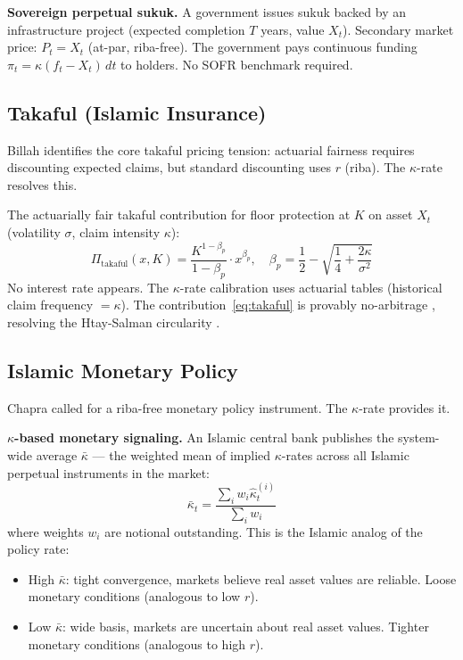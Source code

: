 \documentclass[10pt,twocolumn]{article}
\theoremstyle{plain}
\theoremstyle{definition}
\begin{document}
\textbf{Sovereign perpetual sukuk.}
A government issues sukuk backed by an infrastructure project
(expected completion $T$ years, value $X_t$). Secondary market
price: $P_t = X_t$ (at-par, riba-free). The government pays
continuous funding $\pi_t = \kappa(f_t - X_t)\,dt$ to holders.
No SOFR benchmark required.

\subsection{Takaful (Islamic Insurance)}
\label{sec:takaful}

Billah \cite{Billah2007} identifies the core takaful pricing
tension: actuarial fairness requires discounting expected claims,
but standard discounting uses $r$ (riba). The $\kappa$-rate
resolves this.

The actuarially fair takaful contribution for floor protection
at $K$ on asset $X_t$ (volatility $\sigma$, claim intensity $\kappa$):
\begin{equation}
\Pi_{\text{takaful}}(x,K) = \frac{K^{1-\beta_p}}{1-\beta_p}
\cdot x^{\beta_p},\quad
\beta_p = \frac{1}{2} - \sqrt{\frac{1}{4} + \frac{2\kappa}{\sigma^2}}
\label{eq:takaful}
\end{equation}
No interest rate appears. The $\kappa$-rate calibration uses
actuarial tables (historical claim frequency $=\kappa$). The
contribution~\eqref{eq:takaful} is provably no-arbitrage
\cite{Ahmed2026b}, resolving the Htay-Salman circularity
\cite{HtaySalman2012}.

\subsection{Islamic Monetary Policy}
\label{sec:policy}

Chapra \cite{Chapra1985} called for a riba-free monetary policy
instrument. The $\kappa$-rate provides it.

\textbf{$\kappa$-based monetary signaling.}
An Islamic central bank publishes the system-wide average $\bar\kappa$
--- the weighted mean of implied $\kappa$-rates across all
Islamic perpetual instruments in the market:
\begin{equation}
\bar\kappa_t = \frac{\sum_i w_i \hat\kappa_t^{(i)}}{\sum_i w_i}
\label{eq:kappa_policy}
\end{equation}
where weights $w_i$ are notional outstanding. This is the
Islamic analog of the policy rate:
\begin{itemize}[leftmargin=*, noitemsep]
\item High $\bar\kappa$: tight convergence, markets believe
real asset values are reliable. Loose monetary conditions
(analogous to low $r$).
\item Low $\bar\kappa$: wide basis, markets are uncertain
about real asset values. Tighter monetary conditions
(analogous to high $r$).
\end{itemize}
\end{document}
